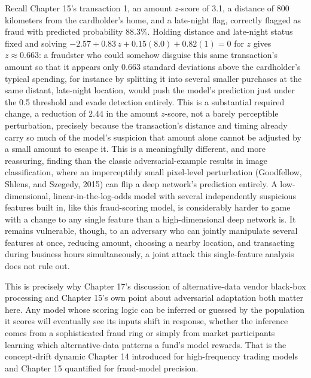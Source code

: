\documentclass[../ai_in_finance]{subfiles}
\begin{document}
Recall Chapter 15's transaction 1, an amount $z$-score of 3.1, a distance of 800 kilometers from the cardholder's home, and a late-night flag, correctly flagged as fraud with predicted probability $88.3\%$. Holding distance and late-night status fixed and solving $-2.57 + 0.83\,z + 0.15(8.0) + 0.82(1) = 0$ for $z$ gives $z \approx 0.663$: a fraudster who could somehow disguise this same transaction's amount so that it appears only $0.663$ standard deviations above the cardholder's typical spending, for instance by splitting it into several smaller purchases at the same distant, late-night location, would push the model's prediction just under the 0.5 threshold and evade detection entirely. This is a substantial required change, a reduction of $2.44$ in the amount $z$-score, not a barely perceptible perturbation, precisely because the transaction's distance and timing already carry so much of the model's suspicion that amount alone cannot be adjusted by a small amount to escape it. This is a meaningfully different, and more reassuring, finding than the classic adversarial-example results in image classification, where an imperceptibly small pixel-level perturbation (Goodfellow, Shlens, and Szegedy, 2015) can flip a deep network's prediction entirely. A low-dimensional, linear-in-the-log-odds model with several independently suspicious features built in, like this fraud-scoring model, is considerably harder to game with a change to any single feature than a high-dimensional deep network is. It remains vulnerable, though, to an adversary who can jointly manipulate several features at once, reducing amount, choosing a nearby location, and transacting during business hours simultaneously, a joint attack this single-feature analysis does not rule out.

This is precisely why Chapter 17's discussion of alternative-data vendor black-box processing and Chapter 15's own point about adversarial adaptation both matter here. Any model whose scoring logic can be inferred or guessed by the population it scores will eventually see its inputs shift in response, whether the inference comes from a sophisticated fraud ring or simply from market participants learning which alternative-data patterns a fund's model rewards. That is the concept-drift dynamic Chapter 14 introduced for high-frequency trading models and Chapter 15 quantified for fraud-model precision.
\end{document}
